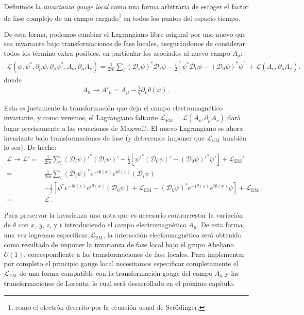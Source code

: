 Definimos la \emph{invarianza gauge local} como una forma arbitraria de escoger el factor de fase complejo de un campo cargado\footnote{como el electrón descrito por la ecuación usual de  Scrödinger.} en todos los puntos del espacio tiempo.

\begin{frame}
De esta forma, podemos cambiar el Lagrangiano libre original por uno nuevo que sea invariante bajo transformaciones de fase locales, asegurándonos de considerar todos los término extra posibles, en particular los asociados al nuevo campo $A_{\mu}$:
\begin{align}
   \mathcal{L}(\psi,\psi^*,\partial_\mu\psi,\partial_\mu\psi^*,A_\nu,\partial_{\mu} A_{\nu} )
=\frac{1}{2m}\sum_i\left(\mathcal{D}_i\psi\right)^*\mathcal{D}_i\psi-\frac{i}{2}
  \left[\psi^*\mathcal{D}_0\psi-\left(\mathcal{D}_0\psi\right)^*\psi\right]+\mathcal{L}\left( A_{\nu},\partial_{\mu} A_{\nu} \right).
\end{align}
donde
\begin{align}
\label{eq:167qft}
  A_\mu\to A'_\mu=A_\mu-\frac{1}{q}\partial_\mu\theta(x)\,.
\end{align}
\end{frame}
Esta es justamente la transformación que deja el campo electromagnético invariante, y como veremos, el Lagrangiano faltante $\mathcal{L}_{\text{EM}}=\mathcal{L}\left( A_{\nu},\partial_{\mu} A_{\nu} \right)$ dará lugar precisamente a las ecuaciones de Maxwell!. El nuevo Lagrangiano es ahora invariante bajo transformaciones de fase (y deberemos imponer que $\mathcal{L}_{\text{EM}}$ también lo sea). De hecho:
\begin{align}
  \mathcal{L}\to \mathcal{L}'=&
\frac{1}{2m}\sum_i{\left(\mathcal{D}_i\psi\right)'}^*\left(\mathcal{D}_i\psi\right)'
-\frac{i}{2}\left[{\psi'}^*\left(\mathcal{D}_0\psi\right)'-{\left(\mathcal{D}_0\psi\right)'}^*\psi'\right]+\mathcal{L}_{\text{EM}}'\nonumber\\
=&
\frac{1}{2m}\sum_i{\left(\mathcal{D}_i\psi\right)}^*e^{-i\theta(x)}e^{i\theta(x)}\left(\mathcal{D}_i\psi\right)\nonumber\\
&-\frac{i}{2}\left[{\psi}^*e^{-i\theta(x)}e^{i\theta(x)}\left(\mathcal{D}_0\psi\right)+\mathcal{L}_{\text{EM}}
-{\left(\mathcal{D}_0\psi\right)}^*e^{-i\theta(x)}e^{i\theta(x)}\psi\right]+\mathcal{L}_{\text{EM}}\,.\nonumber\\
=&\mathcal{L}\,.
\end{align}

Para preservar la invarianza uno nota que es necesario contrarrestar la variación de  $\theta$ con $x$, $y$, $z$, y $t$ 
introduciendo el campo electromagnético  $A_\mu$. De esta forma, una vez logremos especificar $\mathcal{L}_{\text{EM}}$, la interacción electromagnética será obtenida como resultado de imponer la invarianza de fase local bajo el grupo Abeliano  $U(1)$, correspondiente a las transformaciones de fase locales. Para implementar por completo el principio gauge local necesitamos especificar completamente el $\mathcal{L}_{\text{EM}}$ de una forma compatible con la transformación gauge del campo $A_{\mu}$ y las transformaciones de Lorentz, lo cual será desarrollado en el próximo capítulo. 

